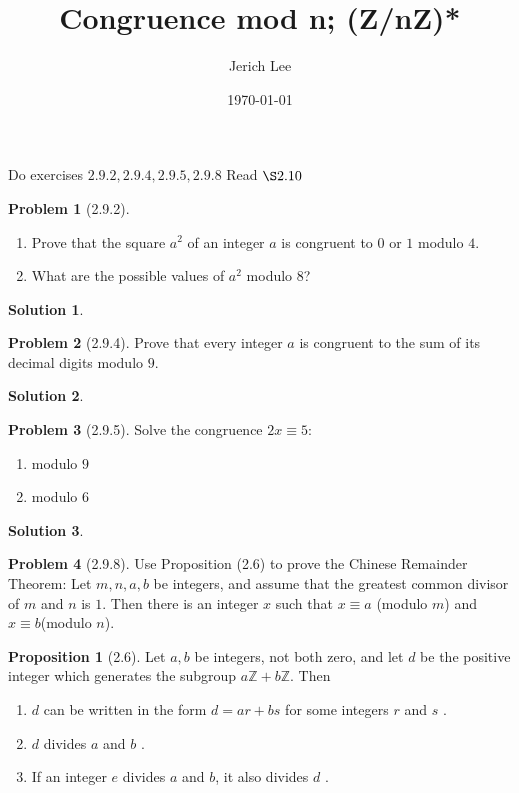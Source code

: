 \documentclass[12pt]{article}
\title{Congruence mod n; (Z/nZ)*}
\author{Jerich Lee}
\date{\today}
\theoremstyle{definition} %
\newtheorem{solution}{Solution}
\newtheorem{proposition}{Proposition}
\newtheorem{problem}{Problem}
\theoremstyle{plain} %
\begin{document}
\maketitle
Do exercises $2.9.2, 2.9.4, 2.9.5, 2.9.8$
Read $\S 2.10$  
\begin{problem}[2.9.2]
   \noindent
   \begin{enumerate}
    \item Prove that the square $a^{2}$ of an integer $a$ is congruent to $0$ or $1$ modulo $4$.
    \item What are the possible values of $a^{2}$ modulo $8$?    
   \end{enumerate} 
\end{problem}
\begin{solution}
    
\end{solution}
\begin{problem}[2.9.4]
   Prove that every integer $a$ is congruent to the sum of its decimal digits modulo $9$.  
\end{problem}
\begin{solution}
    
\end{solution}
\begin{problem}[2.9.5]
   Solve the congruence $2x \equiv 5$:
   \noindent
   \begin{enumerate}
    \item modulo $9$
    \item modulo $6$  
   \end{enumerate}  
\end{problem}
\begin{solution}
    
\end{solution}
\begin{problem}[2.9.8]
   Use Proposition (2.6) to prove the Chinese Remainder Theorem: Let $m,n,a,b$ be integers, and assume that the greatest common divisor of $m$ and $n$ is $1$. Then there is an integer $x$ such that $x \equiv a$ (modulo $m$) and $x \equiv b$(modulo $n$).
   \begin{proposition}[2.6]
    Let $a,b$ be integers, not both zero, and let $d$ be the positive integer which generates the subgroup $a\mathbb{{Z}}+b\mathbb{{Z}}$. Then
    \noindent
    \begin{enumerate}
        \item $d$ can be written in the form $d=ar + bs$ for some integers $r$ and $s$ .
        \item $d$ divides $a$ and $b$ .
        \item If an integer $e$ divides $a$ and $b$, it also divides $d$ .
    \end{enumerate} 
   \end{proposition}     
\end{problem}
\end{document}
